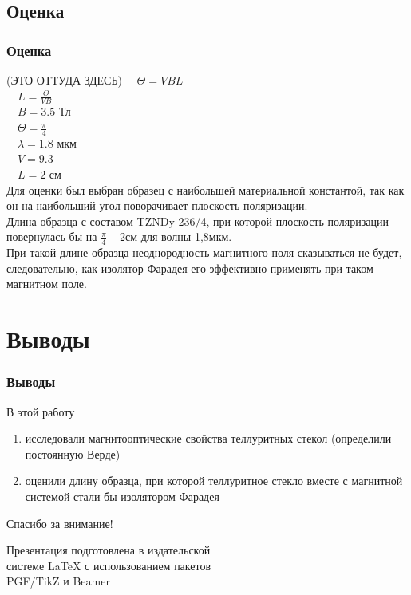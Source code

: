 \documentclass[10pt,pdf,hyperref={unicode}, dvipsnames, handout]{beamer}
\begin{document}
\begin{frame}
	\subsection{Оценка}
	\frametitle{Оценка}
	(ЭТО ОТТУДА ЗДЕСЬ)
		$\quad \Theta=VBL$\\
		$\quad L=\frac{\Theta}{VB}$\\
		$\quad B=3.5$ Тл\\
		$\quad \Theta=\frac{\pi}{4}$\\
		$\quad \lambda=1.8$ мкм\\
		$\quad V=9.3$ \\
		$\quad L=2$ см\\
	Для оценки был выбран образец с наибольшей материальной константой, так как он на наибольший угол поворачивает плоскость поляризации.\\

	Длина образца с составом TZNDy-236/4, при которой плоскость поляризации повернулась бы на $\frac{\pi}{4}$ -- 2см для волны 1,8мкм.\\	

	При такой длине образца неоднородность магнитного поля сказываться не будет, следовательно, как изолятор Фарадея его эффективно применять при таком магнитном поле.
	
\end{frame}
\section{Выводы}
\begin{frame}
	\frametitle{Выводы}
	В этой работу
		\begin{enumerate}
		\item исследовали магнитооптические свойства теллуритных стекол (определили постоянную Верде)
		\item оценили длину образца, при которой теллуритное стекло вместе с магнитной системой стали бы изолятором Фарадея
	\end{enumerate}
\end{frame}

\begin{frame}[plain]
	\vspace{4cm}
	\begin{center}
		\Huge
		Спасибо за внимание!
	\end{center}
	\vspace{2.5cm}
	\begin{center}
		\color{black!30!white}
		Презентация подготовлена в издательской \\
		системе LaTeX с использованием пакетов \\
		PGF/TikZ и Beamer
	\end{center}
\end{frame}

	

\end{document}

